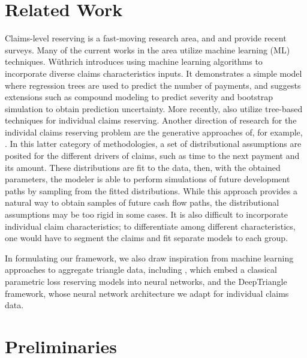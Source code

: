 \documentclass{article}
\begin{document}
\section{Related Work}

Claims-level reserving is a fast-moving research area, and 
\cite{boumezouedIndividualClaims2017} and \cite{taylorLossReserving2019} provide
recent surveys. Many of the current works in the area utilize machine learning 
(ML) techniques. Wüthrich \cite{wuthrichMachineLearning2018} introduces using machine 
learning algorithms to incorporate diverse claims characteristics inputs. It 
demonstrates a simple model where regression trees are used to predict the
number of payments, and suggests extensions such as compound modeling to predict
severity and bootstrap simulation to obtain prediction uncertainty. More 
recently,  \cite{duvalIndividualLoss2019, lopezTreeBasedAlgorithm2019, 
baudryMachineLearning} also utilize tree-based techniques for individual claims
reserving. Another direction of research for the individal claims reserving 
problem are the generative approaches of, for example, 
\cite{antonioMicrolevelStochastic2014, pigeonIndividualLoss2013, 
pigeonIndividualLoss2014}. In this latter category of methodologies, a set of
distributional assumptions are posited for the different drivers of claims, 
such as time to the next payment and its amount. These distributions are fit to
the data, then, with the obtained parameters, the modeler is able to perform 
simulations of future development paths by sampling from the fitted 
distributions. While this approach provides a natural way to obtain samples of
future cash flow paths, the distributional assumptions may be too rigid in some 
cases. It is also difficult to incorporate individual claim characteristics; to 
differentiate among different characteristics, one would have to segment the 
claims and fit separate models to each group.

In formulating our framework, we also draw inspiration from machine learning 
approaches to aggregate triangle data, including 
\cite{gabrielliNeuralNetwork2019a, gabrielliNeuralNetwork2019}, which embed a
classical parametric loss reserving models into neural networks, and the 
DeepTriangle \cite{kuo2019deeptriangle} framework, whose neural network 
architecture we adapt for individual claims data.

\section{Preliminaries}
\end{document}

